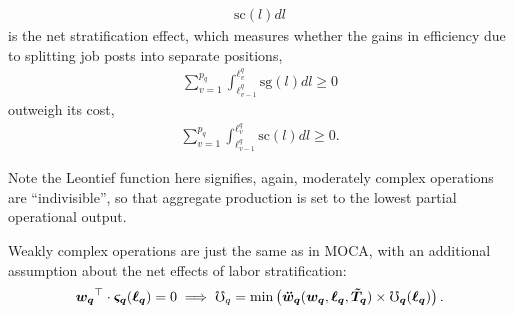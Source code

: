 \documentclass[hidelinks, nonatbib]{elsarticle}
\begin{document}
\begin{axiom}
\begin{subaxiom}
\begin{gather}
        \text{sc}(l)dl
    \end{gather}
    is the net stratification effect, which measures whether the gains in efficiency due to splitting job posts into separate positions,
    \begin{gather}
        \sum_{v=1}^{p_q}
        \int_{\ell_{v-1}^{q}}^{\ell_{v}^{q}}
        \text{sg}(l)dl
        \geq 0
    \end{gather}
    outweigh its cost,
    \begin{gather}
        \sum_{v=1}^{p_q}
        \int_{\ell_{v-1}^{q}}^{\ell_{v}^{q}}
        \text{sc}(l)dl
        \geq 0.
    \end{gather}

    Note the Leontief function here signifies, again, moderately complex operations are ``indivisible'', so that aggregate production is set to the lowest partial operational output.
    \end{subaxiom}

    \begin{subaxiom}
        Weakly complex operations are just the same as in MOCA, with an additional assumption about the net effects of labor stratification:
        \begin{gather}
            \boldsymbol{w_{q}} ^ {\top}
            \cdot 
            \boldsymbol{\varsigma_{q}}(
                \boldsymbol{\ell_{q}}
            )
            =
            0
            \implies
            \mho_q
            =
            \min\left(
                \boldsymbol{\ddot{w}_{q}}(
                    \boldsymbol{w_{q}},
                    \boldsymbol{\ell_{q}},
                    \boldsymbol{\tilde{T}_{q}}
                )
                \times
                \boldsymbol{\mho_{q}}(
                    \boldsymbol{\ell_{q}}
                )
            \right)
            .
    \end{gather}


\end{subaxiom}
\end{axiom}
\end{document}
